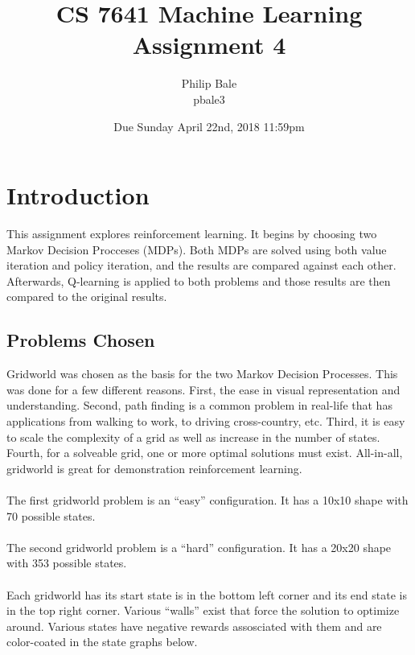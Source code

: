 \documentclass[h]{article}
\title{CS 7641 Machine Learning \\ Assignment 4}
\date{Due Sunday April 22nd, 2018 11:59pm}
\author{Philip Bale \\ pbale3}
\begin{document}
\maketitle

\section*{Introduction}  
This assignment explores reinforcement learning.  It begins by choosing two 
Markov Decision Procceses (MDPs).  Both MDPs are solved using both value 
iteration and policy iteration, and the results are compared against each other. 
 Afterwards, Q-learning is applied to both problems and those results are then 
 compared to the original results.
 
\subsection*{Problems Chosen}
Gridworld was chosen as the basis for the two Markov Decision Processes.  This 
was done for a few different reasons.  First, the ease in visual representation 
and understanding.  Second, path finding is a common problem in real-life that 
has applications from walking to work, to driving cross-country, etc.  Third, it 
is easy to scale the complexity of a grid as well as increase in the number of 
states.  Fourth, for a solveable grid, one or more optimal solutions must exist. 
 All-in-all, gridworld is great for demonstration reinforcement learning.
 \\ \\ %
 The first gridworld problem is an ``easy'' configuration.  It has a 10x10 
 shape with 70 possible states.
 \\ \\ 
 The second gridworld problem is a ``hard'' configuration.  It has a 20x20 
 shape with 353 possible states.  
 \\ \\
 Each gridworld has its start state is in the bottom left corner and 
 its end state is in the top right corner.  Various ``walls'' exist that force 
 the solution to optimize around.  Various states have negative rewards 
 assosciated with them and are color-coated in the state graphs below.
 
\end{document}
